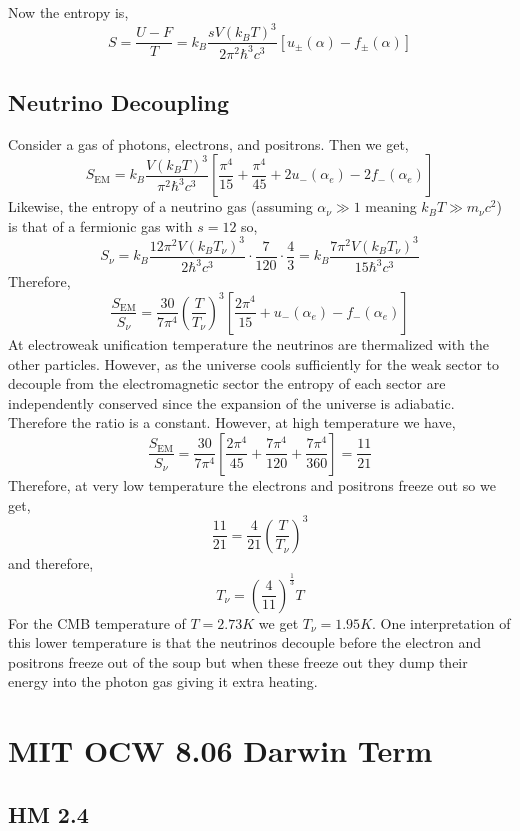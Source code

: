 \documentclass[12pt]{article}
\begin{document}
Now the entropy is,
\[ S = \frac{U - F}{T} = k_B \frac{s V (k_B T)^3}{2 \pi^2 \hbar^3 c^3} [u_{\pm}(\alpha) - f_{\pm}(\alpha)]  \]

\subsection{Neutrino Decoupling}

Consider a gas of photons, electrons, and positrons. Then we get,
\[ S_{\text{EM}} = k_B \frac{V (k_B T)^3}{\pi^2 \hbar^3 c^3} \left[ \frac{\pi^4}{15} + \frac{\pi^4}{45} + 2 u_{-}(\alpha_e) - 2 f_{-}(\alpha_e) \right] \]
Likewise, the entropy of a neutrino gas (assuming $\alpha_\nu \gg 1$ meaning $k_B T \gg m_{\nu} c^2$) is that of a fermionic gas with $s = 12$ so,
\[ S_{\nu} = k_B \frac{12 \pi^2 V (k_B T_\nu)^3}{2 \hbar^3 c^3} \cdot \frac{7}{120} \cdot \frac{4}{3} = k_B \frac{7 \pi^2 V (k_B T_\nu)^3}{15 \hbar^3 c^3}  \]
Therefore,
\[ \frac{S_{\text{EM}}}{S_{\nu}} = \frac{30}{7 \pi^4} \left( \frac{T}{T_\nu} \right)^3 \left[ \frac{2 \pi^4}{15} + u_{-}(\alpha_e) - f_{-}(\alpha_e) \right] \]
At electroweak unification temperature the neutrinos are thermalized with the other particles. However, as the universe cools sufficiently for the weak sector to decouple from the electromagnetic sector the entropy of each sector are independently conserved since the expansion of the universe is adiabatic. Therefore the ratio is a constant. However, at high temperature we have,
\[ \frac{S_{\text{EM}}}{S_{\nu}} = \frac{30}{7 \pi^4}\left[ \frac{2 \pi^4}{45} + \frac{7 \pi^4}{120} + \frac{7 \pi^4}{360} \right] = \frac{11}{21} \]
Therefore, at very low temperature the electrons and positrons freeze out so we get,
\[ \frac{11}{21} = \frac{4}{21} \left( \frac{T}{T_\nu} \right)^3 \]
and therefore,
\[ T_\nu = \left( \frac{4}{11} \right)^{\frac{1}{3}} T \]
For the CMB temperature of $T = 2.73 K$ we get $T_\nu = 1.95 K$. One interpretation of this lower temperature is that the neutrinos decouple before the electron and positrons freeze out of the soup but when these freeze out they dump their energy into the photon gas giving it extra heating. 

\section{MIT OCW 8.06 Darwin Term}

\subsection{HM 2.4}
\end{document}
